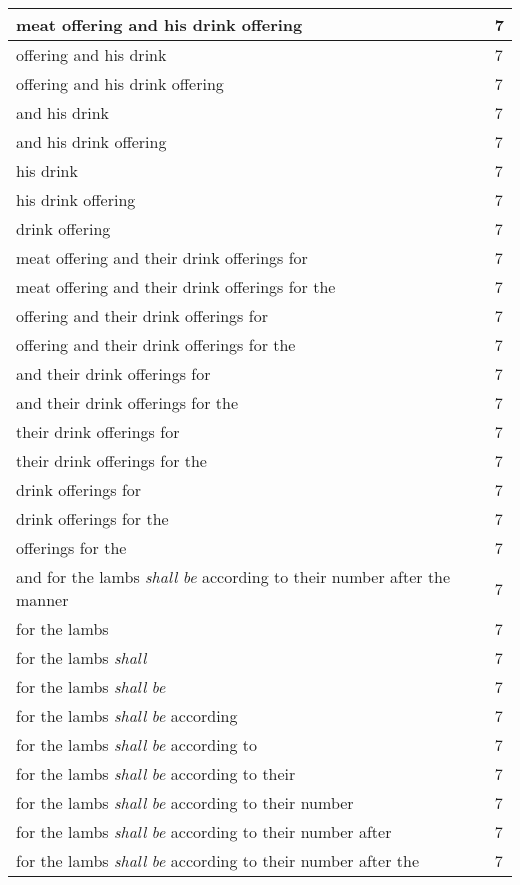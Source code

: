 \begin{center}
\begin{longtable}{|p{3.0in}|p{0.5in}|}
meat offering and his drink offering & 7\\ \hline 
offering and his drink & 7\\ \hline 
offering and his drink offering & 7\\ \hline 
and his drink & 7\\ \hline 
and his drink offering & 7\\ \hline 
his drink & 7\\ \hline 
his drink offering & 7\\ \hline 
drink offering & 7\\ \hline 
meat offering and their drink offerings for & 7\\ \hline 
meat offering and their drink offerings for the & 7\\ \hline 
offering and their drink offerings for & 7\\ \hline 
offering and their drink offerings for the & 7\\ \hline 
and their drink offerings for & 7\\ \hline 
and their drink offerings for the & 7\\ \hline 
their drink offerings for & 7\\ \hline 
their drink offerings for the & 7\\ \hline 
drink offerings for & 7\\ \hline 
drink offerings for the & 7\\ \hline 
offerings for the & 7\\ \hline 
and for the lambs \emph{shall} \emph{be} according to their number after the manner & 7\\ \hline 
for the lambs & 7\\ \hline 
for the lambs \emph{shall} & 7\\ \hline 
for the lambs \emph{shall} \emph{be} & 7\\ \hline 
for the lambs \emph{shall} \emph{be} according & 7\\ \hline 
for the lambs \emph{shall} \emph{be} according to & 7\\ \hline 
for the lambs \emph{shall} \emph{be} according to their & 7\\ \hline 
for the lambs \emph{shall} \emph{be} according to their number & 7\\ \hline 
for the lambs \emph{shall} \emph{be} according to their number after & 7\\ \hline 
for the lambs \emph{shall} \emph{be} according to their number after the & 7\\ \hline 

\end{longtable}
\end{center}

